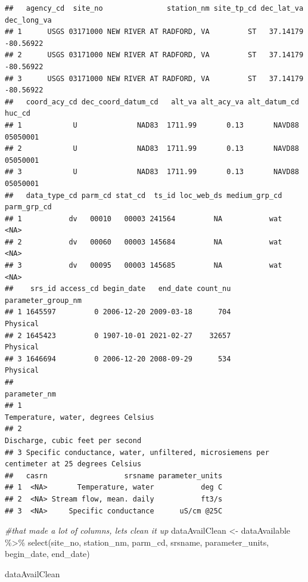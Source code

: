 \documentclass[
]{book}
\newenvironment{Shaded}{\begin{snugshade}}{\end{snugshade}}
\newcommand{\CommentTok}[1]{\textcolor[rgb]{0.56,0.35,0.01}{\textit{#1}}}
\newcommand{\FunctionTok}[1]{\textcolor[rgb]{0.00,0.00,0.00}{#1}}
\newcommand{\NormalTok}[1]{#1}
\newcommand{\OtherTok}[1]{\textcolor[rgb]{0.56,0.35,0.01}{#1}}
\newcommand{\SpecialCharTok}[1]{\textcolor[rgb]{0.00,0.00,0.00}{#1}}
\begin{document}
\begin{verbatim}
##   agency_cd  site_no               station_nm site_tp_cd dec_lat_va dec_long_va
## 1      USGS 03171000 NEW RIVER AT RADFORD, VA         ST   37.14179   -80.56922
## 2      USGS 03171000 NEW RIVER AT RADFORD, VA         ST   37.14179   -80.56922
## 3      USGS 03171000 NEW RIVER AT RADFORD, VA         ST   37.14179   -80.56922
##   coord_acy_cd dec_coord_datum_cd   alt_va alt_acy_va alt_datum_cd   huc_cd
## 1            U              NAD83  1711.99       0.13       NAVD88 05050001
## 2            U              NAD83  1711.99       0.13       NAVD88 05050001
## 3            U              NAD83  1711.99       0.13       NAVD88 05050001
##   data_type_cd parm_cd stat_cd  ts_id loc_web_ds medium_grp_cd parm_grp_cd
## 1           dv   00010   00003 241564         NA           wat        <NA>
## 2           dv   00060   00003 145684         NA           wat        <NA>
## 3           dv   00095   00003 145685         NA           wat        <NA>
##    srs_id access_cd begin_date   end_date count_nu parameter_group_nm
## 1 1645597         0 2006-12-20 2009-03-18      704           Physical
## 2 1645423         0 1907-10-01 2021-02-27    32657           Physical
## 3 1646694         0 2006-12-20 2008-09-29      534           Physical
##                                                                                 parameter_nm
## 1                                                        Temperature, water, degrees Celsius
## 2                                                           Discharge, cubic feet per second
## 3 Specific conductance, water, unfiltered, microsiemens per centimeter at 25 degrees Celsius
##   casrn                  srsname parameter_units
## 1  <NA>       Temperature, water           deg C
## 2  <NA> Stream flow, mean. daily           ft3/s
## 3  <NA>     Specific conductance      uS/cm @25C
\end{verbatim}

\begin{Shaded}
\begin{Highlighting}[]
\CommentTok{\#that made a lot of columns, let\textquotesingle{}s clean it up}
\NormalTok{dataAvailClean }\OtherTok{\textless{}{-}}\NormalTok{ dataAvailable }\SpecialCharTok{\%\textgreater{}\%} \FunctionTok{select}\NormalTok{(site\_no, }
\NormalTok{                                           station\_nm,}
\NormalTok{                                           parm\_cd, }
\NormalTok{                                           srsname, }
\NormalTok{                                           parameter\_units,}
\NormalTok{                                           begin\_date, }
\NormalTok{                                           end\_date)}

\NormalTok{dataAvailClean}
\end{Highlighting}
\end{Shaded}
\end{document}
